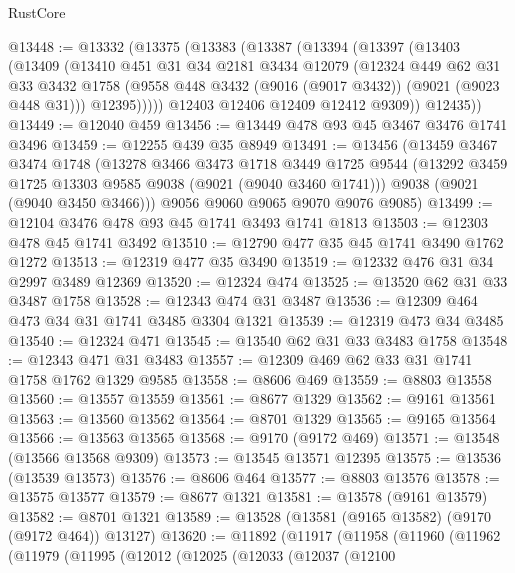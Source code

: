 \begin{lexlean}{RustCore}
\begin{coremodule}
@13448 := @13332
    (@13375
      (@13383
        (@13387
          (@13394
            (@13397
              (@13403
                (@13409
                  (@13410
                    @451
                    @31
                    @34
                    @2181
                    @3434
                    @12079
                    (@12324
                      @449
                      @62
                      @31
                      @33
                      @3432
                      @1758
                      (@9558 @448 @3432 (@9016 (@9017 @3432)) (@9021 (@9023 @448 @31)))
                      @12395)))))
            @12403
            @12406
            @12409
            @12412
            @9309))
        @12435))
@13449 := @12040 @459
@13456 := @13449 @478 @93 @45 @3467 @3476 @1741 @3496
@13459 := @12255 @439 @35 @8949
@13491 := @13456
    (@13459
      @3467
      @3474
      @1748
      (@13278
        @3466
        @3473
        @1718
        @3449
        @1725
        @9544
        (@13292 @3459 @1725 @13303 @9585 @9038 (@9021 (@9040 @3460 @1741)))
        @9038
        (@9021 (@9040 @3450 @3466)))
      @9056
      @9060
      @9065
      @9070
      @9076
      @9085)
@13499 := @12104 @3476 @478 @93 @45 @1741 @3493 @1741 @1813
@13503 := @12303 @478 @45 @1741 @3492
@13510 := @12790 @477 @35 @45 @1741 @3490 @1762 @1272
@13513 := @12319 @477 @35 @3490
@13519 := @12332 @476 @31 @34 @2997 @3489 @12369
@13520 := @12324 @474
@13525 := @13520 @62 @31 @33 @3487 @1758
@13528 := @12343 @474 @31 @3487
@13536 := @12309 @464 @473 @34 @31 @1741 @3485 @3304 @1321
@13539 := @12319 @473 @34 @3485
@13540 := @12324 @471
@13545 := @13540 @62 @31 @33 @3483 @1758
@13548 := @12343 @471 @31 @3483
@13557 := @12309 @469 @62 @33 @31 @1741 @1758 @1762 @1329 @9585
@13558 := @8606 @469
@13559 := @8803 @13558
@13560 := @13557 @13559
@13561 := @8677 @1329
@13562 := @9161 @13561
@13563 := @13560 @13562
@13564 := @8701 @1329
@13565 := @9165 @13564
@13566 := @13563 @13565
@13568 := @9170 (@9172 @469)
@13571 := @13548 (@13566 @13568 @9309)
@13573 := @13545 @13571 @12395
@13575 := @13536 (@13539 @13573)
@13576 := @8606 @464
@13577 := @8803 @13576
@13578 := @13575 @13577
@13579 := @8677 @1321
@13581 := @13578 (@9161 @13579)
@13582 := @8701 @1321
@13589 := @13528 (@13581 (@9165 @13582) (@9170 (@9172 @464)) @13127)
@13620 := @11892
    (@11917
      (@11958
        (@11960
          (@11962
            (@11979
              (@11995
                (@12012
                  (@12025
                    (@12033
                      (@12037
                        (@12100

\end{coremodule}
\end{lexlean}
